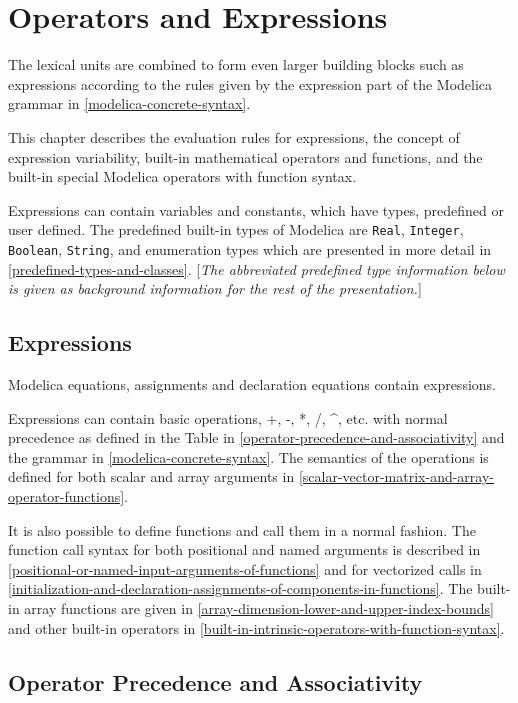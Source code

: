 \chapter{Operators and Expressions}

The lexical units are combined to form even larger building blocks such
as expressions according to the rules given by the expression part of
the Modelica grammar in \autoref{modelica-concrete-syntax}.

This chapter describes the evaluation rules for expressions, the concept
of expression variability, built-in mathematical operators and
functions, and the built-in special Modelica operators with function
syntax.

Expressions can contain variables and constants, which have types,
predefined or user defined. The predefined built-in types of Modelica
are \lstinline!Real!, \lstinline!Integer!, \lstinline!Boolean!, \lstinline!String!, and enumeration types which are
presented in more detail in \autoref{predefined-types-and-classes}. {[}\emph{The abbreviated
predefined type information below is given as background information for
the rest of the presentation.}{]}

\section{Expressions}

Modelica equations, assignments and declaration equations contain
expressions.

Expressions can contain basic operations, +, -, *, /, \^{}, etc. with
normal precedence as defined in the Table in \autoref{operator-precedence-and-associativity} and the grammar
in \autoref{modelica-concrete-syntax}. The semantics of the operations is defined for both
scalar and array arguments in \autoref{scalar-vector-matrix-and-array-operator-functions}.

It is also possible to define functions and call them in a normal
fashion. The function call syntax for both positional and named
arguments is described in \autoref{positional-or-named-input-arguments-of-functions} and for vectorized calls in
\autoref{initialization-and-declaration-assignments-of-components-in-functions}. The built-in array functions are given in \autoref{array-dimension-lower-and-upper-index-bounds}
and other built-in operators in \autoref{built-in-intrinsic-operators-with-function-syntax}.

\section{Operator Precedence and Associativity}

